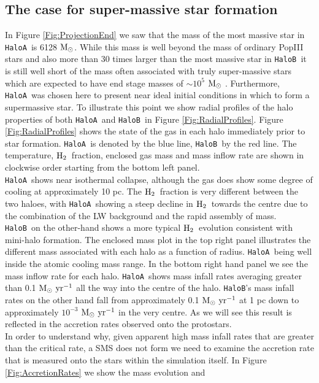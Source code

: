 \documentclass[graphics, twocolumn, usenatbib]{mn2e}
\newcommand{\msolar} {$\rm{M_{\odot}}~$}
\newcommand{\msolarc} {$\rm{M_{\odot}}$}
\newcommand{\msolaryr} {$\rm{M_{\odot}~yr^{-1}}~$}
\newcommand{\molH} {$\rm{H_2}$~}
\newcommand{\ha} {\texttt{HaloA~}}
\newcommand{\hb} {\texttt{HaloB~}}
\newcommand{\hbc} {\texttt{HaloB}}
\begin{document}
\subsection{The case for super-massive star formation}
In Figure \ref{Fig:ProjectionEnd} we saw that the mass of the most massive star in \ha is
6128 \msolarc. While this mass is well beyond the mass of ordinary PopIII stars \citep{Turk_2009, Greif_2011, Wise_2012b, Crosby_2013, Susa_2014, Hirano_2014, Stacy_2016} and also more than 30 times
larger than the most massive star in \hb it is still well short of the mass often associated with
truly super-massive stars \citep[e.g.][]{Woods_2018} which are expected to have
end stage masses of $\sim 10^5$ \msolar. Furthermore, \ha was chosen here to present near ideal initial conditions in which to form a supermassive star.
To illustrate this point we show radial profiles of the halo properties of both \ha and \hb in
Figure \ref{Fig:RadialProfiles}. Figure \ref{Fig:RadialProfiles} shows the state of the gas in each halo immediately prior to star formation. \ha is denoted by the blue line, \hb by the red line.
The temperature, \molH fraction, enclosed gas mass and mass inflow rate are shown in clockwise order starting from the bottom left panel. \\
\indent \ha shows near isothermal collapse, although the gas does
show some degree of cooling at approximately 10 pc. The \molH fraction is very different between
the two haloes, with \ha showing a steep decline in \molH towards the centre due to the combination
of the LW background and the rapid assembly of mass. \hb on the other-hand shows a more typical
\molH evolution consistent with mini-halo formation. The enclosed mass plot in the top right panel
illustrates the different mass associated with each halo as a function of radius. \ha being well
inside the atomic cooling mass range. In the bottom right hand panel we see the mass inflow rate for
each halo. \ha shows mass infall rates averaging greater than 0.1 \msolaryr all the way into the
centre of the halo. \hbc's mass infall rates on the other hand fall from approximately
0.1 \msolaryr at 1 pc down to approximately $10^{-3}$ \msolaryr in the very centre. As we will see
this result is reflected in the accretion rates observed onto the protostars. \\
\indent In order to understand why, given apparent high mass infall rates that are greater than the
critical rate, a SMS does not form we need to examine the accretion rate that is measured onto the
stars within the simulation itself. In Figure \ref{Fig:AccretionRates} we show the mass evolution and
\end{document}
